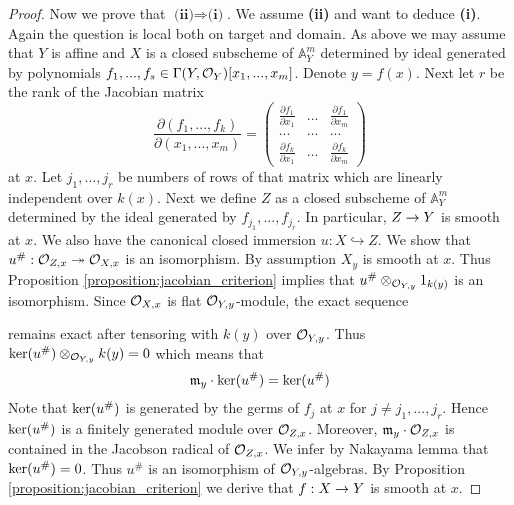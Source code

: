 \begin{proof}
Now we prove that $\textbf{(ii)}\Rightarrow \textbf{(i)}$. We assume \textbf{(ii)} and want to deduce \textbf{(i)}. Again the question is local both on target and domain.  As above we may assume that $Y$ is affine and $X$ is a closed subscheme of $\mathbb{A}^{m}_Y$ determined by ideal generated by polynomials $f_1,...,f_s\in \Gamma(Y,{\mathcal O}_Y)[x_1,...,x_{m}]$. Denote $y = f(x)$. Next let $r$ be the rank of the Jacobian matrix
$$\frac{\partial(f_1,...,f_k)}{\partial(x_1,...,x_{m})}= \left( \begin{array}{ccc}
\frac{\partial f_1}{\partial x_1} & ... & \frac{\partial f_1}{\partial x_{m}} \\
... &...  &...  \\
\frac{\partial f_k}{\partial x_{1}} &...  & \frac{\partial f_k}{\partial x_{m}}\end{array} \right)$$
at $x$. Let $j_1,...,j_r$ be numbers of rows of that matrix which are linearly independent over $k(x)$. Next we define $Z$ as a closed subscheme of $\mathbb{A}^m_Y$ determined by the ideal generated by $f_{j_1},...,f_{j_r}$. In particular, $Z\rightarrow Y$ is smooth at $x$. We also have the canonical closed immersion $u:X\hookrightarrow Z$. We show that $u^{\#}:{\mathcal O}_{Z,x} \twoheadrightarrow {\mathcal O}_{X,x} $ is an isomorphism. By assumption $X_{y}$ is smooth at $x$. Thus Proposition \ref{proposition:jacobian_criterion} implies that $u^{\#}\otimes_{{\mathcal O}_{Y,y}}1_{k(y)}$ is an isomorphism. Since ${\mathcal O}_{X,x}$ is flat ${\mathcal O}_{Y,y}$-module, the exact sequence
\begin{center}
\end{center}
remains exact after tensoring with $k(y)$ over ${\mathcal O}_{Y,y}$. Thus $\mathrm{ker}(u^{\#})\otimes_{{\mathcal O}_{Y,y}}k(y) = 0$ which means that
$$\mathfrak{m}_y\cdot \mathrm{ker}(u^{\#}) =\mathrm{ker}(u^{\#})$$
Note that $\mathrm{ker}(u^{\#})$ is generated by the germs of $f_j$ at $x$ for $j\neq j_1,...,j_r$. Hence $\mathrm{ker}(u^{\#})$ is a finitely generated module over ${\mathcal O}_{Z,x}$. Moreover, $\mathfrak{m}_y\cdot {\mathcal O}_{Z,x}$ is contained in the Jacobson radical of ${\mathcal O}_{Z,x}$. We infer by Nakayama lemma that $\mathrm{ker}(u^{\#}) = 0$. Thus $u^{\#}$ is an isomorphism of ${\mathcal O}_{Y,y}$-algebras. By Proposition \ref{proposition:jacobian_criterion} we derive that $f:X\rightarrow Y$ is smooth at $x$.
\end{proof}


\small




